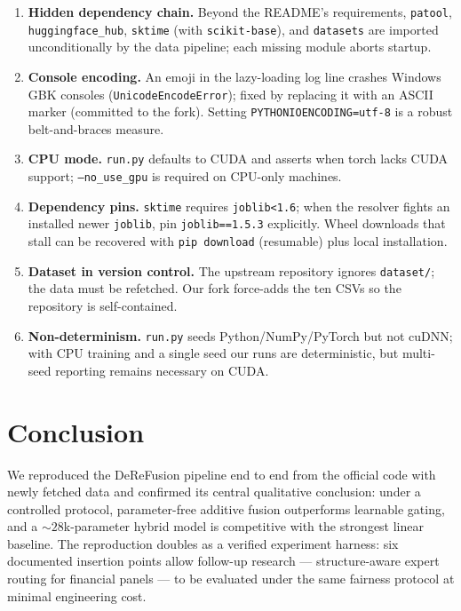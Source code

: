 \documentclass[preprint,12pt]{elsarticle}
\begin{document}
\begin{enumerate}
  \item \textbf{Hidden dependency chain.} Beyond the README's requirements,
        \texttt{patool}, \texttt{huggingface\_hub}, \texttt{sktime}
        (with \texttt{scikit-base}), and \texttt{datasets} are imported
        unconditionally by the data pipeline; each missing module aborts
        startup.
  \item \textbf{Console encoding.} An emoji in the lazy-loading log line
        crashes Windows GBK consoles (\texttt{UnicodeEncodeError}); fixed by
        replacing it with an ASCII marker (committed to the fork).
        Setting \texttt{PYTHONIOENCODING=utf-8} is a robust belt-and-braces
        measure.
  \item \textbf{CPU mode.} \texttt{run.py} defaults to CUDA and asserts when
        torch lacks CUDA support; \texttt{--no\_use\_gpu} is required on
        CPU-only machines.
  \item \textbf{Dependency pins.} \texttt{sktime} requires
        \texttt{joblib<1.6}; when the resolver fights an installed newer
        \texttt{joblib}, pin \texttt{joblib==1.5.3} explicitly. Wheel
        downloads that stall can be recovered with
        \texttt{pip download} (resumable) plus local installation.
  \item \textbf{Dataset in version control.} The upstream repository
        ignores \texttt{dataset/}; the data must be refetched. Our fork
        force-adds the ten CSVs so the repository is self-contained.
  \item \textbf{Non-determinism.} \texttt{run.py} seeds Python/NumPy/PyTorch
        but not cuDNN; with CPU training and a single seed our runs are
        deterministic, but multi-seed reporting remains necessary on CUDA.
\end{enumerate}

\section{Conclusion}
\label{sec:conclusion}

We reproduced the DeReFusion pipeline end to end from the official code with
newly fetched data and confirmed its central qualitative conclusion:
under a controlled protocol, parameter-free additive fusion outperforms
learnable gating, and a ${\sim}28$k-parameter hybrid model is competitive
with the strongest linear baseline. The reproduction doubles as a verified
experiment harness: six documented insertion points allow follow-up
research --- structure-aware expert routing for financial panels --- to be
evaluated under the same fairness protocol at minimal engineering cost.
\end{document}

